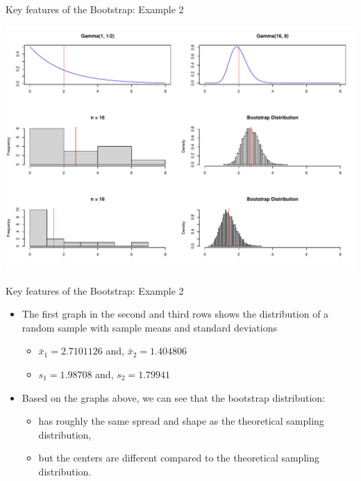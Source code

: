\documentclass[
  ignorenonframetext,
]{beamer}
\providecommand{\tightlist}{%
  \setlength{\itemsep}{0pt}\setlength{\parskip}{0pt}}
\begin{document}
\begin{frame}{Key features of the Bootstrap: Example 2}
\protect\hypertarget{key-features-of-the-bootstrap-example-2-2}{}
\tiny

\begin{center}\includegraphics[width=0.9\linewidth,height=0.75\textheight]{Week10A_files/figure-beamer/unnamed-chunk-5-1} \end{center}
\normalsize
\end{frame}

\begin{frame}{Key features of the Bootstrap: Example 2}
\protect\hypertarget{key-features-of-the-bootstrap-example-2-3}{}
\begin{itemize}
\item
  The first graph in the second and third rows shows the distribution of
  a random sample with sample means and standard deviations

  \begin{itemize}
  \tightlist
  \item
    \(\bar{x}_1= 2.7101126\) and, \(\bar{x}_2=1.404806\)
  \item
    \(s_1= 1.98708\) and, \(s_2=1.79941\)
  \end{itemize}
\item
  Based on the graphs above, we can see that the bootstrap distribution:

  \begin{itemize}
  \tightlist
  \item
    has roughly the same spread and shape as the theoretical sampling
    distribution,
  \item
    but the centers are different compared to the theoretical sampling
    distribution.
  \end{itemize}
\end{itemize}
\end{frame}
\end{document}
